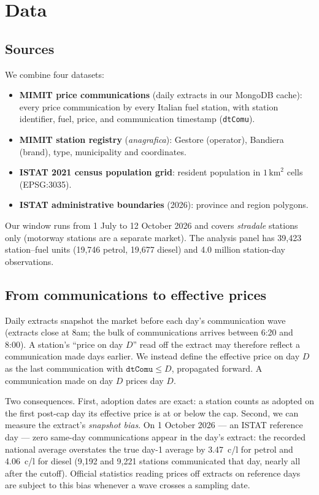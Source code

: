 \documentclass[11pt]{article}
\begin{document}
\section{Data}
\label{sec:data}

\subsection{Sources}

We combine four datasets:
\begin{itemize}
\item \textbf{MIMIT price communications} (daily extracts in our MongoDB
cache): every price communication by every Italian fuel station, with
station identifier, fuel, price, and communication timestamp
(\texttt{dtComu}).
\item \textbf{MIMIT station registry} (\emph{anagrafica}): Gestore
(operator), Bandiera (brand), type, municipality and coordinates.
\item \textbf{ISTAT 2021 census population grid}: resident population in
$1\,\mathrm{km}^2$ cells (EPSG:3035).
\item \textbf{ISTAT administrative boundaries} (2026): province and
region polygons.
\end{itemize}
Our window runs from 1 July to 12 October 2026 and covers
\emph{stradale} stations only (motorway stations are a separate market).
The analysis panel has 39{,}423 station--fuel units (19{,}746 petrol,
19{,}677 diesel) and 4.0 million station-day observations.

\subsection{From communications to effective prices}
\label{sec:dtcomu}

Daily extracts snapshot the market before each day's communication wave
(extracts close at 8am; the bulk of communications arrives between 6:20
and 8:00). A station's ``price on day $D$'' read off the extract may
therefore reflect a communication made days earlier. We instead define
the effective price on day $D$ as the last communication with
$\texttt{dtComu} \le D$, propagated forward. A communication made on day
$D$ prices day $D$.

Two consequences. First, adoption dates are exact: a station counts as
adopted on the first post-cap day its effective price is at or below the
cap. Second, we can measure the extract's \emph{snapshot bias}. On
1 October 2026 --- an ISTAT reference day --- zero same-day
communications appear in the day's extract: the recorded national average
overstates the true day-1 average by 3.47~c/l for petrol and 4.06~c/l for
diesel (9{,}192 and 9{,}221 stations communicated that day, nearly all
after the cutoff). Official statistics reading prices off extracts on
reference days are subject to this bias whenever a wave crosses a
sampling date.
\end{document}
